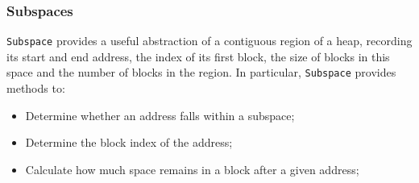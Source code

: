 \subsubsection{Subspaces}

\texttt{Subspace} provides a useful abstraction of a contiguous region of a heap,
recording its start and end address, the index of its first block, the size of 
blocks in this space and the number of blocks in the region. In particular,
\texttt{Subspace} provides methods to:
\begin{itemize}
\item Determine whether an address falls within a subspace;
\item Determine the block index of the address;
\item Calculate how much space remains in a block after a given address;
\end{itemize}



